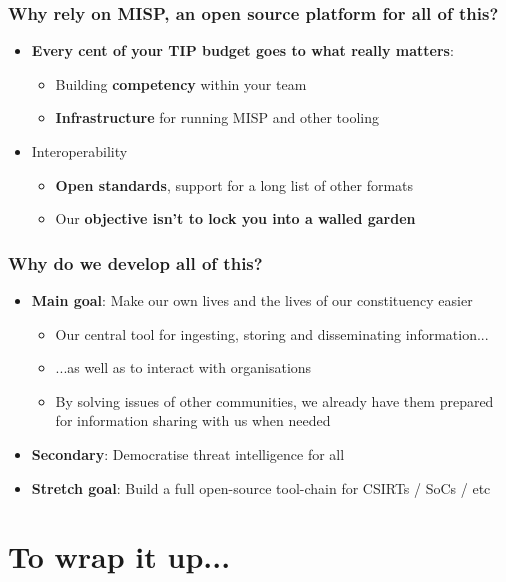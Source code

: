 \begin{frame}
\frametitle{Why rely on MISP, an open source platform for all of this?}
    \begin{itemize}
        \item {\bf Every cent of your TIP budget goes to what really matters}:
        \begin{itemize}
            \item Building {\bf competency} within your team
            \item {\bf Infrastructure} for running MISP and other tooling
        \end{itemize}
        \item Interoperability
        \begin{itemize}
            \item {\bf Open standards}, support for a long list of other formats
            \item Our {\bf objective isn't to lock you into a walled garden}
        \end{itemize}
    \end{itemize}
\end{frame}


\begin{frame}
\frametitle{Why do we develop all of this?}      
\begin{itemize}
   \item {\bf Main goal}: Make our own lives and the lives of our constituency easier
   \begin{itemize}
       \item Our central tool for ingesting, storing and disseminating information...
       \item ...as well as to interact with organisations
       \item By solving issues of other communities, we already have them prepared for information sharing with us when needed
   \end{itemize}
   \item {\bf Secondary}: Democratise threat intelligence for all
   \item {\bf Stretch goal}: Build a full open-source tool-chain for CSIRTs / SoCs / etc
\end{itemize}
\end{frame}

\section{To wrap it up...}


